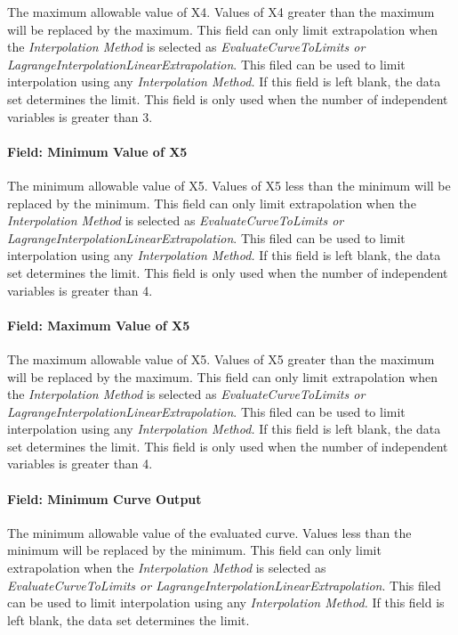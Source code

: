 The maximum allowable value of X4. Values of X4 greater than the maximum will be replaced by the maximum. This field can only limit extrapolation when the \emph{Interpolation Method} is selected as \emph{EvaluateCurveToLimits or LagrangeInterpolationLinearExtrapolation}. This filed can be used to limit interpolation using any \emph{Interpolation Method.} If this field is left blank, the data set determines the limit. This field is only used when the number of independent variables is greater than 3.

\paragraph{Field: Minimum Value of X5}\label{field-minimum-value-of-x5}

The minimum allowable value of X5. Values of X5 less than the minimum will be replaced by the minimum. This field can only limit extrapolation when the \emph{Interpolation Method} is selected as \emph{EvaluateCurveToLimits or LagrangeInterpolationLinearExtrapolation}. This filed can be used to limit interpolation using any \emph{Interpolation Method.} If this field is left blank, the data set determines the limit. This field is only used when the number of independent variables is greater than 4.

\paragraph{Field: Maximum Value of X5}\label{field-maximum-value-of-x5}

The maximum allowable value of X5. Values of X5 greater than the maximum will be replaced by the maximum. This field can only limit extrapolation when the \emph{Interpolation Method} is selected as \emph{EvaluateCurveToLimits or LagrangeInterpolationLinearExtrapolation}. This filed can be used to limit interpolation using any \emph{Interpolation Method.} If this field is left blank, the data set determines the limit. This field is only used when the number of independent variables is greater than 4.

\paragraph{Field: Minimum Curve Output}\label{field-minimum-curve-output-000}

The minimum allowable value of the evaluated curve. Values less than the minimum will be replaced by the minimum. This field can only limit extrapolation when the \emph{Interpolation Method} is selected as \emph{EvaluateCurveToLimits or LagrangeInterpolationLinearExtrapolation}. This filed can be used to limit interpolation using any \emph{Interpolation Method.} If this field is left blank, the data set determines the limit.


